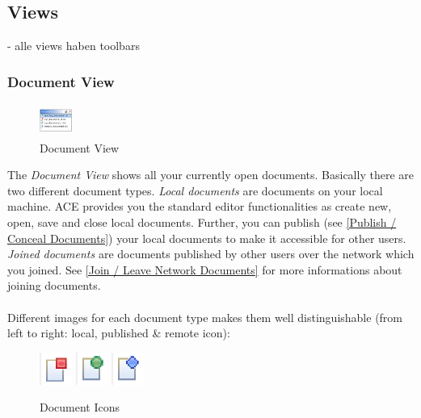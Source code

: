 \documentclass[11pt,a4paper]{article}
\begin{document}
\subsection{Views}
- alle views haben toolbars

\subsubsection{Document View}
\begin{figure}[H]
\begin{center}
  \includegraphics[height=30pt, width=30pt]{../images/usermanual/dview_overview.bmp.eps}
\caption{Document View}
\label{default}
\end{center}
\end{figure}

The \textit{Document View} shows all your currently open documents. Basically there are two different document types. \textit{Local documents} are documents on your local machine. ACE provides you the standard editor functionalities as create new, open, save and close local documents. Further, you can publish (see \ref{Publish / Conceal Documents}) your local documents to make it accessible for other users. \textit{Joined documents} are documents published by other users over the network which you joined. See \ref{Join / Leave Network Documents} for more informations about joining documents. \\
\\
Different images for each document type makes them well distinguishable (from left to right: local, published \& remote icon):

\begin{figure}[H]
\begin{center}
  \includegraphics[height=30pt, width=30pt]{../images/usermanual/icon_local.bmp.eps}
\vspace{9pt}
  \includegraphics[height=30pt, width=30pt]{../images/usermanual/icon_published.bmp.eps}
\vspace{9pt}
  \includegraphics[height=30pt, width=30pt]{../images/usermanual/icon_remote.bmp.eps}
\caption{Document Icons}
\label{default}
\end{center}
\end{figure}
\end{document}
